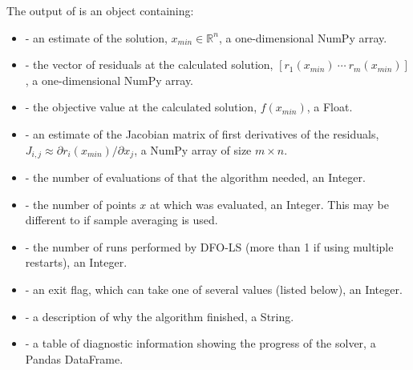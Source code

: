 \documentclass[letterpaper,10pt,english]{sphinxmanual}
\begin{document}
The output of  is an object containing:
\begin{itemize}
\item {} 
 - an estimate of the solution, \(x_{min}\in\mathbb{R}^n\), a one-dimensional NumPy array.

\item {} 
 - the vector of residuals at the calculated solution, \([r_1(x_{min})\:\cdots\: r_m(x_{min})]\), a one-dimensional NumPy array.

\item {} 
 - the objective value at the calculated solution, \(f(x_{min})\), a Float.

\item {} 
 - an estimate of the Jacobian matrix of first derivatives of the residuals, \(J_{i,j} \approx \partial r_i(x_{min})/\partial x_j\), a NumPy array of size \(m\times n\).

\item {} 
 - the number of evaluations of  that the algorithm needed, an Integer.

\item {} 
 - the number of points \(x\) at which  was evaluated, an Integer. This may be different to  if sample averaging is used.

\item {} 
 - the number of runs performed by DFO-LS (more than 1 if using multiple restarts), an Integer.

\item {} 
 - an exit flag, which can take one of several values (listed below), an Integer.

\item {} 
 - a description of why the algorithm finished, a String.

\item {} 
 - a table of diagnostic information showing the progress of the solver, a Pandas DataFrame.

\end{itemize}
\end{document}
